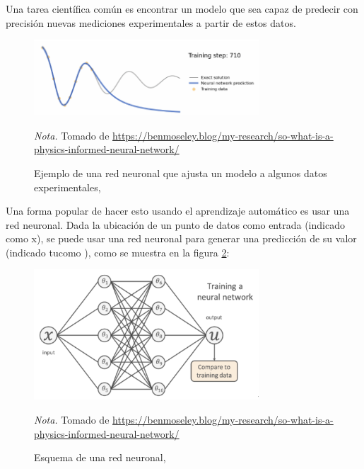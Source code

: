 Una tarea científica común es encontrar un modelo que sea capaz de predecir con precisión nuevas mediciones experimentales a partir de estos datos.
\begin{figure}[htbp]
    \caption{Ejemplo de una red neuronal que ajusta un modelo a algunos datos experimentales\sep}
    \label{figure:redNeuronal01}
    \begin{center}
        \includegraphics[width=0.75\textwidth]{img/redNeuronal01.png}
    \end{center}
        \begin{tablenotes}
            \item {{\fontsize{10pt}{ \baselineskip}\selectfont \textit{Nota.} Tomado de \url{https://benmoseley.blog/my-research/so-what-is-a-physics-informed-neural-network/} }}
        \end{tablenotes}
\end{figure}

Una forma popular de hacer esto usando el aprendizaje automático es usar una red neuronal. Dada la ubicación de un punto de datos como entrada (indicado como x), se puede usar una red neuronal para generar una predicción de su valor (indicado tucomo ), como se muestra en la figura \ref{figure:redNeuronal02}:
\begin{figure}[htbp]
    \caption{Esquema de una red neuronal\sep}
    \label{figure:redNeuronal02}
    \begin{center}
        \includegraphics[width=0.75\textwidth]{img/redNeuronal02.png}
    \end{center}
        \begin{tablenotes}
            \item {{\fontsize{10pt}{ \baselineskip}\selectfont \textit{Nota.} Tomado de \url{https://benmoseley.blog/my-research/so-what-is-a-physics-informed-neural-network/}}}
        \end{tablenotes}
\end{figure}

